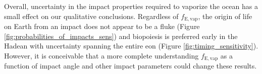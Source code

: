 \documentclass[manuscript]{aastex63}
\begin{document}
Overall, uncertainty in the impact properties required to vaporize the ocean has a small effect on our qualitative conclusions. Regardless of $f_\mathrm{E,vap}$, the origin of life on Earth from an impact does not appear to be a fluke (Figure \ref{fig:probabilities_of_impacts_sens}) and biopoiesis is preferred early in the Hadean with uncertainty spanning the entire eon (Figure \ref{fig:timing_sensitivity}). However, it is conceivable that a more complete understanding $f_\mathrm{E,vap}$ as a function of impact angle and other impact parameters could change these results.



\end{document}
